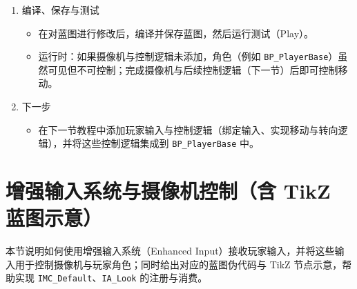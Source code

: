 \documentclass[10pt,CJKmath]{zhbook-v1}
\newcommand{\il}[1]{\texttt{#1}}%
\begin{document}
\begin{enumerate}
  \item 编译、保存与测试
    \begin{itemize}
      \item 在对蓝图进行修改后，编译并保存蓝图，然后运行测试（Play）。
      \item 运行时：如果摄像机与控制逻辑未添加，角色（例如 \il{BP_PlayerBase}）虽然可见但不可控制；完成摄像机与后续控制逻辑（下一节）后即可控制移动。
    \end{itemize}

  \item 下一步
    \begin{itemize}
      \item 在下一节教程中添加玩家输入与控制逻辑（绑定输入、实现移动与转向逻辑），并将这些控制逻辑集成到 \il{BP_PlayerBase} 中。
    \end{itemize}
\end{enumerate}

\section{增强输入系统与摄像机控制（含 TikZ 蓝图示意）}

本节说明如何使用增强输入系统（Enhanced Input）接收玩家输入，并将这些输入用于控制摄像机与玩家角色；同时给出对应的蓝图伪代码与 TikZ 节点示意，帮助实现 \il{IMC_Default}、\il{IA_Look} 的注册与消费。
\end{document}
